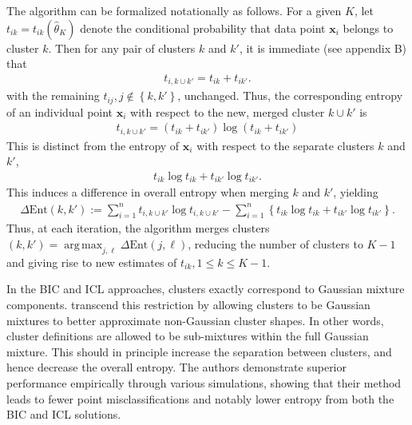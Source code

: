 \documentclass{uwstat572}
\newcommand*\ba{\[ \begin{aligned}}
\newcommand*\ea{\end{aligned} \]}
\newcommand*\set[1]{\left\{#1\right\}}
\newcommand*\estim[1]{\widehat{#1}}
\newcommand*\bx{\mathbf{x}}
\DeclareMathOperator*{\argmax}{arg\;max}
\renewcommand\;{\,}
\begin{document}
The algorithm can be formalized notationally as follows.
For a given $K$, let $t_{ik} = t_{ik}(\estim\theta_K)$ denote the conditional probability that data point $\bx_i$ belongs to cluster $k$.
Then for any pair of clusters $k$ and $k'$, it is immediate (see appendix B) that
\ba
t_{i, k\cup k'} = t_{ik} + t_{ik'}.
\ea
with the remaining $t_{ij}, j \not\in \set{k, k'}$, unchanged.
Thus, the corresponding entropy of an individual point $\bx_i$ with respect to the new, merged cluster $k \cup k'$ is
\ba
t_{i, k\cup k'} = \left(t_{ik} + t_{ik'}\right) \log\left( t_{ik} + t_{ik'} \right)
\ea
This is distinct from the entropy of $\bx_i$ with respect to the separate clusters $k$ and $k'$,
\ba
t_{ik} \log t_{ik} + t_{ik'} \log t_{ik'}.
\ea
This induces a difference in overall entropy when merging $k$ and $k'$, yielding
\ba
\Delta\text{Ent}( k, k') :=
\sum_{i=1}^n t_{i,k\cup k'} \log t_{i, k \cup k'}
- \sum_{i=1}^n \left\{ t_{ik} \log t_{ik} + t_{ik'} \log t_{ik'} \right\}.
\ea
Thus, at each iteration, the algorithm merges clusters $(k, k') = \argmax_{j, \ell} \Delta\text{Ent}(j, \ell)$, reducing the number of clusters to $K - 1$ and giving rise to new estimates of $t_{ik}, 1 \le k \le K - 1$. 

In the BIC and ICL approaches, clusters exactly correspond to Gaussian mixture components.
\cite{Baudry10} transcend this restriction by allowing clusters to be Gaussian mixtures to better approximate non-Gaussian cluster shapes.
In other words, cluster definitions are allowed to be sub-mixtures within the full Gaussian mixture.
This should in principle increase the separation between clusters, and hence decrease the overall entropy.
The authors demonstrate superior performance empirically through various simulations, showing that their method leads to fewer point misclassifications and notably lower entropy from both the BIC and ICL solutions.
\end{document}
